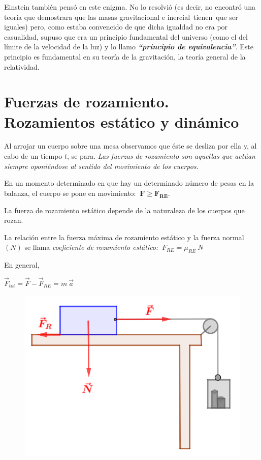 Einstein también pensó en este enigma. No lo resolvió (es decir, no encontró una teoría que demostrara que las masas gravitacional e inercial tienen que ser iguales) pero, como estaba convencido de que dicha igualdad no era por casualidad, supuso que era un principio fundamental del universo (como el del límite de la velocidad de la luz) y lo llamo \textbf{\emph{``principio de equivalencia''}}. Este principio es fundamental en su teoría de la gravitación, la teoría general de la relatividad.

		
\section[Fuerzas de rozamiento. Rozamientos estático y dinámico]{Fuerzas de rozamiento. Rozamientos estático y dinámico }

Al arrojar un cuerpo sobre una mesa observamos que	éste se desliza por ella y, al cabo de un tiempo	 $t$, se para. \emph{Las fuerzas de rozamiento son aquellas que actúan siempre oponiéndose al sentido del movimiento de los cuerpos.}

\begin{multicols}{2}
En un momento determinado en que hay un determinado número de pesas en la balanza, el cuerpo se pone en movimiento: $\ \boldsymbol{F\ge F_{RE}}$.

La fuerza de rozamiento estático depende de la naturaleza de los cuerpos que rozan.

La relación entre la fuerza máxima de rozamiento estático y la fuerza normal $(N)$ se llama \emph{coeficiente de rozamiento estático:} $\ F_{RE}=\mu_{RE}\ N$

En general,

$\vec F_{tot}=\vec F-\vec F_{RE}=m\ \vec a$

\begin{figure}[H]
		\centering
		\includegraphics[width=.4\textwidth]{imagenes/imagenes03/T03IM48.png}
		\end{figure}		
\end{multicols}		
		
